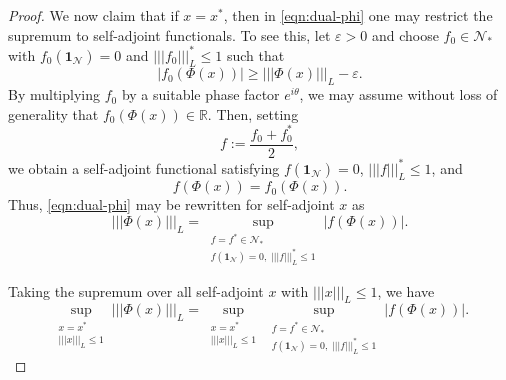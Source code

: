 \documentclass[11pt,reqno]{amsart}
\numberwithin{equation}{section}
\newcommand{\mb}{\mathbb}
\newcommand{\mc}{\mathcal}
\newcommand{\pw}[1]{{\color{blue}[PW: #1]}}
\begin{document}
\begin{proof}
We now claim that if $x = x^*$, then in \eqref{eqn:dual-phi} one may restrict the supremum to self-adjoint functionals. To see this, let $\varepsilon>0$ and choose $f_0\in \mc N_*$ with $f_0(\mathbf{1}_{\mc N})=0$ and $|||f_0|||_L^*\le 1$ such that
\[
|f_0(\Phi(x))| \ge |||\Phi(x)|||_L - \varepsilon.
\]
By multiplying $f_0$ by a suitable phase factor $e^{i\theta}$, we may assume without loss of generality that $f_0(\Phi(x))\in \mathbb{R}$. Then, setting
\[
f := \frac{f_0 + f_0^*}{2},
\]
we obtain a self-adjoint functional satisfying $f(\mathbf{1}_{\mc N}) = 0$, $|||f|||_L^*\le 1$, and 
\[
f(\Phi(x)) = f_0(\Phi(x)).
\]
Thus, \eqref{eqn:dual-phi} may be rewritten for self-adjoint $x$ as
\[
||| \Phi(x) |||_L = \sup_{\substack{f=f^* \in \mc N_* \\ f(\mathbf{1}_{\mc N}) = 0,\; |||f|||_L^* \le 1}} |f(\Phi(x))|.
\]

Taking the supremum over all self-adjoint $x$ with $|||x|||_L\le 1$, we have
\[
\sup_{\substack{x=x^* \\ |||x|||_L \le 1}} |||\Phi(x)|||_L = \sup_{\substack{x=x^* \\ |||x|||_L \le 1}} \sup_{\substack{f=f^* \in \mc N_* \\ f(\mathbf{1}_{\mc N}) = 0,\; |||f|||_L^* \le 1}} |f(\Phi(x))|.
\]

\end{proof}
\end{document}

